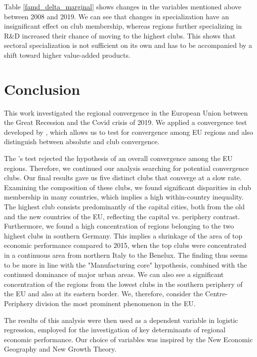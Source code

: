 \documentclass[11pt]{article}
\begin{document}
Table \ref{famd_delta_marginal} shows changes in the variables mentioned above between 2008 and 2019. We can see that changes in specialization have an insignificant effect on club membership, whereas regions further specializing in R\&D increased their chance of moving to the highest clubs. This shows that sectoral specialization is not sufficient on its own and has to be accompanied by a shift toward higher value-added products.

\section{Conclusion}

This work investigated the regional convergence in the European Union between the Great Recession and the Covid crisis of 2019. We applied a convergence test developed by \citet{phillips2009economic}, which allows us to test for convergence among EU regions and also distinguish between absolute and club convergence.

The \citeauthor{phillips2009economic}'s test rejected the hypothesis of an overall convergence among the EU regions. Therefore, we continued our analysis searching for potential convergence clubs. Our final results gave us five distinct clubs 
that converge at a slow rate. Examining the composition of these clubs, we found significant disparities in club membership in many countries, which implies a high within-country inequality. The highest club consists predominantly of the capital cities, both from the old and the new countries of the EU, reflecting the capital vs. periphery contrast. Furthermore, we found a high concentration of regions belonging to the two highest clubs in southern Germany. This implies a shrinkage of the area of top economic performance compared to 2015, when the top clubs were concentrated in a continuous area from northern Italy to the Benelux. The finding thus seems to be more in line with the "Manufacturing core" hypothesis, combined with the continued dominance of major urban areas. We can also see a significant concentration of the regions from the lowest clubs in the southern periphery of the EU and also at its eastern border. We, therefore, consider the Centre-Periphery division the most prominent phenomenon in the EU.

The results of this analysis were then used as a dependent variable in logistic regression, employed for the investigation of key determinants of regional economic performance. Our choice of variables was inspired by the New Economic Geography and New Growth Theory.
\end{document}
